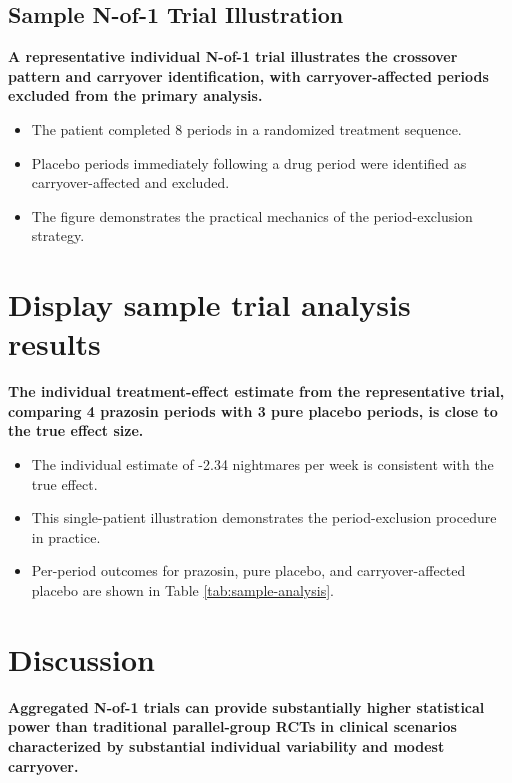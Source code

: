 \documentclass[
  11pt,
]{article}
\begin{document}
\subsection{Sample N-of-1 Trial Illustration}\label{sample-n-of-1-trial-illustration}

\textbf{A representative individual N-of-1 trial illustrates the crossover pattern and carryover identification, with carryover-affected periods excluded from the primary analysis.}

\begin{itemize}\setlength{\itemsep}{2pt}\setlength{\parskip}{0pt}
\item The patient completed 8 periods in a randomized treatment sequence.
\item Placebo periods immediately following a drug period were identified as carryover-affected and excluded.
\item The figure demonstrates the practical mechanics of the period-exclusion strategy.
\end{itemize}

\section{Display sample trial analysis results}\label{display-sample-trial-analysis-results}

\textbf{The individual treatment-effect estimate from the representative trial, comparing 4 prazosin periods with 3 pure placebo periods, is close to the true effect size.}

\begin{itemize}\setlength{\itemsep}{2pt}\setlength{\parskip}{0pt}
\item The individual estimate of -2.34 nightmares per week is consistent with the true effect.
\item This single-patient illustration demonstrates the period-exclusion procedure in practice.
\item Per-period outcomes for prazosin, pure placebo, and carryover-affected placebo are shown in Table \ref{tab:sample-analysis}.
\end{itemize}

\section{Discussion}\label{discussion}

\textbf{Aggregated N-of-1 trials can provide substantially higher statistical power than traditional parallel-group RCTs in clinical scenarios characterized by substantial individual variability and modest carryover.}
\end{document}
